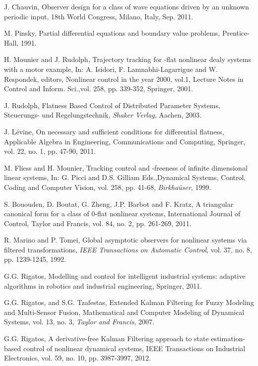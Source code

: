\documentclass[journal]{IEEEtran}
\begin{document}
\begin{thebibliography}{100}
 \label{Chau11}
J. Chauvin, Observer design for a class of wave equations driven by an unknown periodic input, 18th World Congress, Milano, Italy, Sep. 2011.

 \label{Pin91}
M. Pinsky, Partial differential equations and boundary value problems, Prentice-Hall, 1991.


 \label{MouRud01}
H. Mounier and J. Rudolph, Trajectory tracking for -flat nonlinear dealy systems with a motor example, In: A.
Isidori, F. Lamnabhi-Lagarrigue and W. Respondek, editors, Nonlinear control in the year 2000, vol.1, Lecture
Notes in Control and Inform. Sci.,vol. 258, pp. 339-352, Springer, 2001.


 \label{Rud03}
J. Rudolph, Flatness Based Control of Distributed Parameter Systems, Steuerungs- und Regelungstechnik,
\textit{Shaker Verlag}, Aachen, 2003.

 \label{Lev10}
J. L\'{e}vine, On necessary and sufficient conditions for differential flatness, Applicable Algebra in Engineering, Communications and Computing,  Springer, vol. 22, no. 1, pp. 47-90, 2011.

 \label{FliMou99}
M. Fliess and H. Mounier, Tracking control and -freeness of infinite dimensional linear systems, In: G. Picci and D.S. Gilliam Eds.,Dynamical Systems, Control, Coding and Computer Vision, vol. 258, pp. 41-68, \textit{Birkha\"{u}ser}, 1999.

 \label{BouBouZheBarKra11}
S. Bououden, D. Boutat, G. Zheng, J.P. Barbot and F. Kratz, A triangular canonical form for a class of 0-flat nonlinear systems, International Journal of Control, Taylor and Francis, vol. 84, no. 2, pp. 261-269, 2011.

 \label{MarTom92}
R. Marino and P. Tomei, Global asymptotic observers for nonlinear systems via filtered transformations, \textit{IEEE Transactions on Automatic Control}, vol. 37, no. 8, pp. 1239-1245, 1992.

 \label{Rig11}
G.G. Rigatos, Modelling and control for intelligent industrial systems: adaptive algorithms in robotics and industrial engineering, Springer, 2011.

 \label{RigTza07}
G.G. Rigatos, and S.G. Tzafestas, Extended Kalman Filtering for Fuzzy Modeling and Multi-Sensor Fusion, Mathematical and Computer Modeling of Dynamical Systems, vol. 13, no. 3, \textit{Taylor and Francis}, 2007.

 \label{Rig12a}
G.G. Rigatos, A derivative-free Kalman Filtering approach to state estimation-based control of nonlinear dynamical systems, IEEE Transactions on Industrial Electronics, vol. 59, no. 10, pp. 3987-3997, 2012.


\end{thebibliography}
\end{document}
